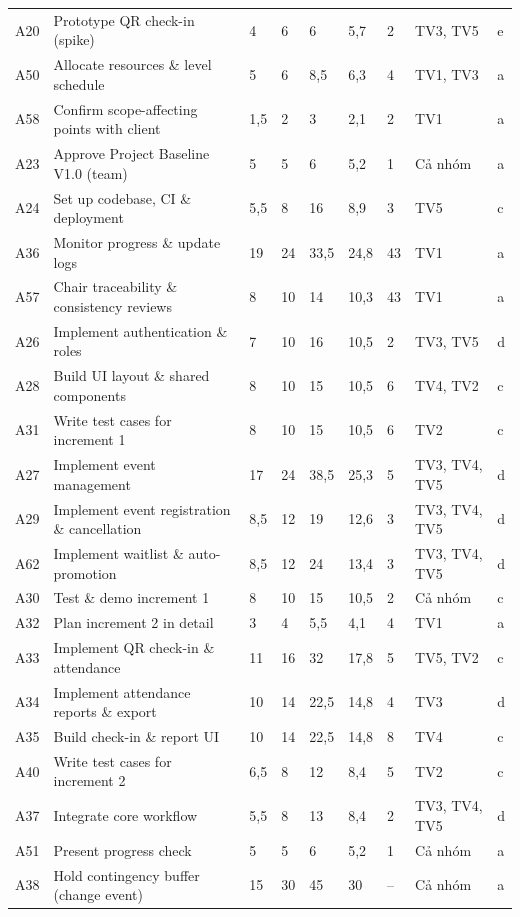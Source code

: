 \begin{landscape}
\begin{longtable}{L{1.2cm}L{6.0cm}L{1.1cm}L{1.1cm}L{1.1cm}L{1.1cm}L{2.0cm}L{3.2cm}L{1.4cm}}
A20 & Prototype QR check-in (spike) & 4 & 6 & 6 & 5,7 & 2 & TV3, TV5 & e \\
A50 & Allocate resources \& level schedule & 5 & 6 & 8,5 & 6,3 & 4 & TV1, TV3 & a \\
A58 & Confirm scope-affecting points with client & 1,5 & 2 & 3 & 2,1 & 2 & TV1 & a \\
A23 & Approve Project Baseline V1.0 (team) & 5 & 5 & 6 & 5,2 & 1 & Cả nhóm & a \\
A24 & Set up codebase, CI \& deployment & 5,5 & 8 & 16 & 8,9 & 3 & TV5 & c \\
A36 & Monitor progress \& update logs & 19 & 24 & 33,5 & 24,8 & 43 & TV1 & a \\
A57 & Chair traceability \& consistency reviews & 8 & 10 & 14 & 10,3 & 43 & TV1 & a \\
A26 & Implement authentication \& roles & 7 & 10 & 16 & 10,5 & 2 & TV3, TV5 & d \\
A28 & Build UI layout \& shared components & 8 & 10 & 15 & 10,5 & 6 & TV4, TV2 & c \\
A31 & Write test cases for increment 1 & 8 & 10 & 15 & 10,5 & 6 & TV2 & c \\
A27 & Implement event management & 17 & 24 & 38,5 & 25,3 & 5 & TV3, TV4, TV5 & d \\
A29 & Implement event registration \& cancellation & 8,5 & 12 & 19 & 12,6 & 3 & TV3, TV4, TV5 & d \\
A62 & Implement waitlist \& auto-promotion & 8,5 & 12 & 24 & 13,4 & 3 & TV3, TV4, TV5 & d \\
A30 & Test \& demo increment 1 & 8 & 10 & 15 & 10,5 & 2 & Cả nhóm & c \\
A32 & Plan increment 2 in detail & 3 & 4 & 5,5 & 4,1 & 4 & TV1 & a \\
A33 & Implement QR check-in \& attendance & 11 & 16 & 32 & 17,8 & 5 & TV5, TV2 & c \\
A34 & Implement attendance reports \& export & 10 & 14 & 22,5 & 14,8 & 4 & TV3 & d \\
A35 & Build check-in \& report UI & 10 & 14 & 22,5 & 14,8 & 8 & TV4 & c \\
A40 & Write test cases for increment 2 & 6,5 & 8 & 12 & 8,4 & 5 & TV2 & c \\
A37 & Integrate core workflow & 5,5 & 8 & 13 & 8,4 & 2 & TV3, TV4, TV5 & d \\
A51 & Present progress check & 5 & 5 & 6 & 5,2 & 1 & Cả nhóm & a \\
A38 & Hold contingency buffer (change event) & 15 & 30 & 45 & 30 & -- & Cả nhóm & a \\

\end{longtable}
\end{landscape}
